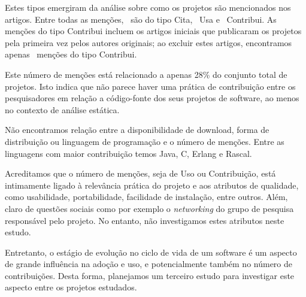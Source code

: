 Estes tipos emergiram da análise sobre como os projetos são mencionados nos
artigos. Entre todas as menções, \CiteCount \ são do tipo Cita, \UseCount \ Usa
e \ContributeCount \ Contribui. As menções do tipo Contribui incluem os artigos
iniciais que publicaram os projetos pela primeira vez pelos autores originais;
ao excluir estes artigos, encontramos apenas \ContributeStudyDoisCount \ menções
do tipo Contribui.

Este número de menções está relacionado a apenas 28\% do conjunto total de
projetos. Isto indica que não parece haver uma prática de contribuição entre os
pesquisadores em relação a código-fonte dos seus projetos de software, ao menos
no contexto de análise estática.

Não encontramos relação entre a disponibilidade de download, forma de
distribuição ou linguagem de programação e o número de menções. Entre as
linguagens com maior contribuição temos Java, C, Erlang e Rascal.

Acreditamos que o número de menções, seja de Uso ou Contribuição, está
intimamente ligado à relevância prática do projeto e aos atributos de
qualidade, como usabilidade, portabilidade, facilidade de instalação, entre
outros. Além, claro de questões sociais como por exemplo o {\it networking} do grupo
de pesquisa responsável pelo projeto. No entanto, não investigamos estes atributos neste estudo.

Entretanto, o estágio de evolução no ciclo de vida de um software é um aspecto
de grande influência na adoção e uso, e potencialmente também no
número de contribuições. Desta forma, planejamos um terceiro estudo para
investigar este aspecto entre os projetos estudados.

